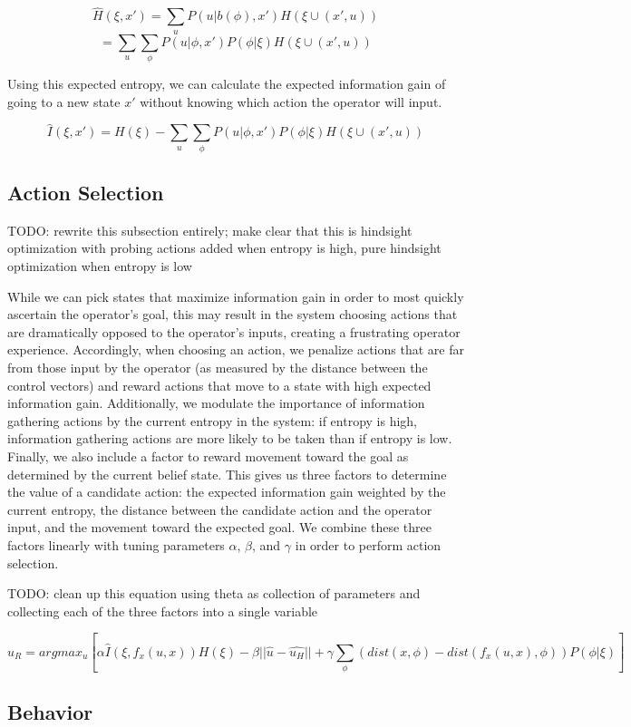 \documentclass[conference]{IEEEtran}
\begin{document}
\[
\hat{H}(\xi, x') = \sum_u P(u|b(\phi),x')H(\xi \cup (x', u))
\]
\[
= \sum_u \sum_\phi P(u|\phi,x')P(\phi|\xi)H(\xi \cup (x', u))
\]

Using this expected entropy, we can calculate the expected information gain of going to a new state $x'$ without knowing which action the operator will input.

\[
\hat{I}(\xi, x') = H(\xi) - \sum_u \sum_\phi P(u|\phi,x')P(\phi|\xi)H(\xi \cup (x', u))
\]

\subsection{Action Selection}

TODO: rewrite this subsection entirely; make clear that this is hindsight optimization with probing actions added when entropy is high, pure hindsight optimization when entropy is low

While we can pick states that maximize information gain in order to most quickly ascertain the operator's goal, this may result in the system choosing actions that are dramatically opposed to the operator's inputs, creating a frustrating operator experience. Accordingly, when choosing an action, we penalize actions that are far from those input by the operator (as measured by the distance between the control vectors) and reward actions that move to a state with high expected information gain. Additionally, we modulate the importance of information gathering actions by the current entropy in the system: if entropy is high, information gathering actions are more likely to be taken than if entropy is low. Finally, we also include a factor to reward movement toward the goal as determined by the current belief state. This gives us three factors to determine the value of a candidate action: the expected information gain weighted by the current entropy, the distance between the candidate action and the operator input, and the movement toward the expected goal. We combine these three factors linearly with tuning parameters $\alpha$, $\beta$, and $\gamma$ in order to perform action selection.

TODO: clean up this equation using theta as collection of parameters and collecting each of the three factors into a single variable

\[
u_R = argmax_u [\alpha \hat{I}(\xi, f_x(u,x))H(\xi) - \beta ||\hat{u}-\hat{u_H}|| + \gamma \sum_\phi (dist(x, \phi) - dist(f_x(u, x), \phi))P(\phi|\xi)]
\]

\subsection{Behavior}
\end{document}
